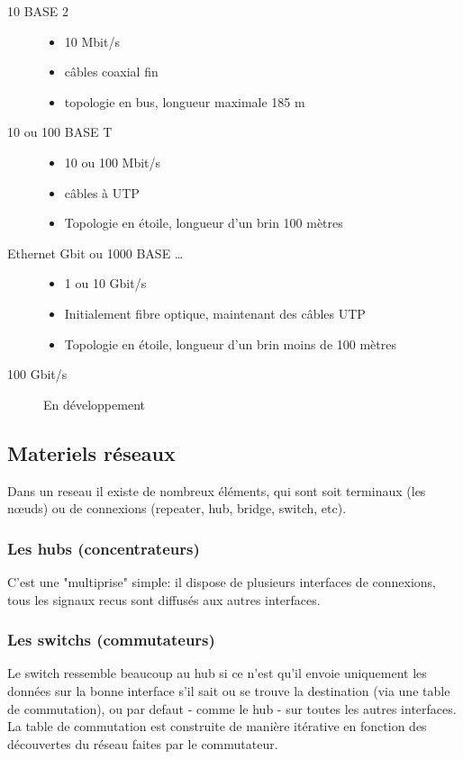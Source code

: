 \documentclass[a4paper, 12pt, french]{article}
\begin{document}
	\begin{description}
		\item[10 BASE 2]
		\begin{itemize}
			\item 10 Mbit/s
			\item câbles coaxial fin
			\item topologie en bus, longueur maximale 185 m
		\end{itemize}
		\item[10 ou 100 BASE T]
		\begin{itemize}
			\item 10 ou 100 Mbit/s
			\item câbles à UTP
			\item Topologie en étoile, longueur d'un brin 100 mètres
		\end{itemize}
		\item[Ethernet Gbit ou 1000 BASE …]
		\begin{itemize}
			\item 1 ou 10 Gbit/s
			\item Initialement fibre optique, maintenant des câbles UTP
			\item Topologie en étoile, longueur d'un brin moins de 100 mètres
		\end{itemize}
		\item[100 Gbit/s] En développement
	\end{description}

	\subsection{Materiels réseaux}

	Dans un reseau il existe de nombreux éléments, qui sont soit terminaux (les nœuds) ou de connexions (repeater, hub, bridge, switch, etc).

	\subsubsection{Les hubs (concentrateurs)}

	C'est une "multiprise" simple: il dispose de plusieurs interfaces de connexions, tous les signaux recus sont diffusés aux autres interfaces.

	\subsubsection{Les switchs (commutateurs)}

	Le switch ressemble beaucoup au hub si ce n'est qu'il envoie uniquement les données sur la bonne interface s'il sait ou se trouve la destination (via une table de commutation), ou par defaut - comme le hub - sur toutes les autres interfaces. La table de commutation est construite de manière itérative en fonction des découvertes du réseau faites par le commutateur.\\
\end{document}
